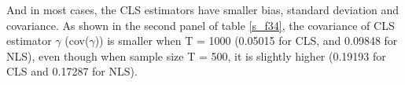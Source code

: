 \documentclass[a4paper,12pt,times,numbered,print,index]{report}
\numberwithin{equation}{section}
\begin{document}
And in most cases, the CLS estimators have smaller bias, standard deviation and covariance. As shown in the second panel of table \ref{s_f34}, the covariance of CLS estimator $\gamma$ (cov($\hat{\gamma}$)) is smaller when T = 1000 (0.05015 for CLS, and 0.09848 for NLS), even though when sample size T = 500, it is slightly higher (0.19193 for CLS and 0.17287 for NLS).


\end{document}
